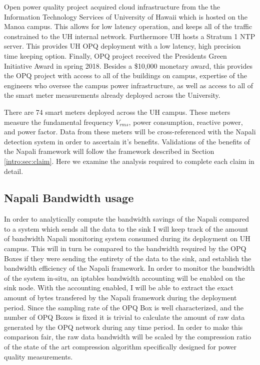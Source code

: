Open power quality project acquired cloud infrastructure from the the Information Technology Services of University of Hawaii which is hosted on the Manoa campus. This allows for low latency operation, and keeps all of the traffic constrained to the UH internal network. Furthermore UH hosts a Stratum 1 NTP server. This provides UH OPQ deployment with a low latency, high precision time keeping option. Finally, OPQ project received the Presidents Green Initiative Award in spring 2018. Besides a \$10,000 monetary award, this provides the OPQ project with access to all of the buildings on campus, expertise of the engineers who oversee the campus power infrastructure, as well as access to all of the smart meter measurements already deployed across the University. 

There are 74 smart meters deployed across the UH campus. These meters measure the fundamental frequency $V_{rms}$, power consumption, reactive power, and power factor. Data from these meters will be cross-referenced with the Napali detection system in order to ascertain it's benefits. Validations of the benefits of the Napali framework will follow the framework described in Section \ref{intro:sec:claim}. Here we examine the analysis required to complete each claim in detail.

\subsection{Napali Bandwidth usage} \label{iexp:sec:band}
In order to analytically compute the bandwidth savings of the Napali compared to a system which sends all the data to the sink I will keep track of the amount of bandwidth Napali monitoring system consumed during its deployment on UH campus. This will in turn be compared to the bandwidth required by the OPQ Boxes if they were sending the entirety of the data to the sink, and establish the bandwidth efficiency of the Napali framework. In order to monitor the bandwidth of the system in-situ, an iptables bandwidth accounting will be enabled on the sink node. With the accounting enabled, I will be able to extract the exact amount of bytes transfered by the Napali framework during the deployment period. Since the sampling rate of the OPQ Box is well characterized, and the number of OPQ Boxes is fixed it is trivial to calculate the amount of raw data generated by the OPQ network during any time period. In order to make this comparison fair, the raw data bandwidth will be scaled by the compression ratio of the state of the art compression algorithm specifically designed for power quality measurements.\cite{zhang2009new}

